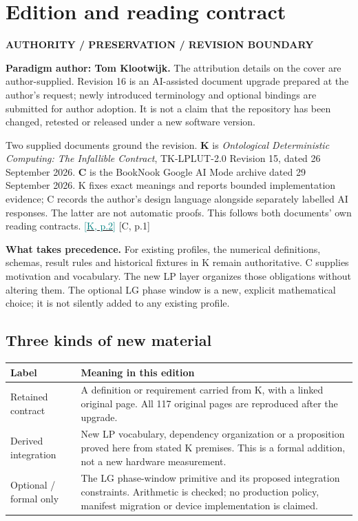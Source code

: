 \documentclass[11pt,a4paper]{article}
\newcommand{\kref}[1]{\hyperlink{baseline.#1}{\textcolor{teal}{[K, p.#1]}}}
\newcommand{\crefpage}[1]{\textcolor{muted}{[C, p.#1]}}
\newcommand{\status}[1]{{\sffamily\bfseries\scriptsize\color{teal}#1}\par}
\theoremstyle{lpstyle}
\begin{document}
\setcounter{page}{2}
\section*{Edition and reading contract}
\status{AUTHORITY / PRESERVATION / REVISION BOUNDARY}
\textbf{Paradigm author: Tom Klootwijk.} The attribution details on the cover are author-supplied. Revision 16 is an AI-assisted document upgrade prepared at the author's request; newly introduced terminology and optional bindings are submitted for author adoption. It is not a claim that the repository has been changed, retested or released under a new software version.

Two supplied documents ground the revision. \textbf{K} is \emph{Ontological Deterministic Computing: The Infallible Contract}, TK-LPLUT-2.0 Revision 15, dated 26 September 2026. \textbf{C} is the BookNook Google AI Mode archive dated 29 September 2026. K fixes exact meanings and reports bounded implementation evidence; C records the author's design language alongside separately labelled AI responses. The latter are not automatic proofs. This follows both documents' own reading contracts. \kref{2} \crefpage{1}

\begin{principle}
\textbf{What takes precedence.} For existing profiles, the numerical definitions, schemas, result rules and historical fixtures in K remain authoritative. C supplies motivation and vocabulary. The new LP layer organizes those obligations without altering them. The optional LG phase window is a new, explicit mathematical choice; it is not silently added to any existing profile.
\end{principle}

\subsection*{Three kinds of new material}
\begin{tabularx}{\textwidth}{L{34mm}Y}
\toprule
\textbf{Label} & \textbf{Meaning in this edition}\\\midrule
Retained contract & A definition or requirement carried from K, with a linked original page. All 117 original pages are reproduced after the upgrade.\\
Derived integration & New LP vocabulary, dependency organization or a proposition proved here from stated K premises. This is a formal addition, not a new hardware measurement.\\
Optional / formal only & The LG phase-window primitive and its proposed integration constraints. Arithmetic is checked; no production policy, manifest migration or device implementation is claimed.\\\bottomrule
\end{tabularx}
\end{document}
